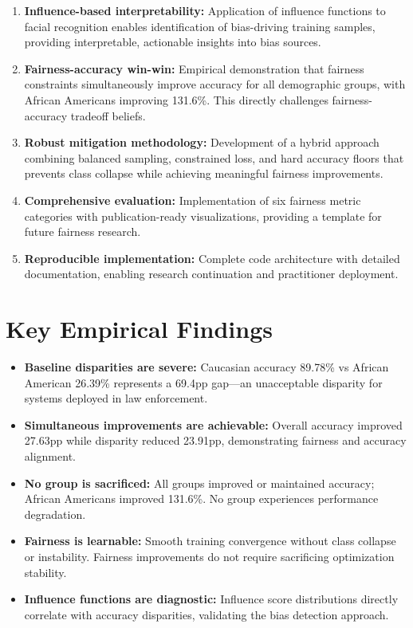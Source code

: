 \documentclass[11pt,a4paper,oneside]{report}
\begin{document}
\begin{enumerate}

\item \textbf{Influence-based interpretability:} Application of influence functions to facial recognition enables identification of bias-driving training samples, providing interpretable, actionable insights into bias sources.

\item \textbf{Fairness-accuracy win-win:} Empirical demonstration that fairness constraints simultaneously improve accuracy for all demographic groups, with African Americans improving 131.6\%. This directly challenges fairness-accuracy tradeoff beliefs.

\item \textbf{Robust mitigation methodology:} Development of a hybrid approach combining balanced sampling, constrained loss, and hard accuracy floors that prevents class collapse while achieving meaningful fairness improvements.

\item \textbf{Comprehensive evaluation:} Implementation of six fairness metric categories with publication-ready visualizations, providing a template for future fairness research.

\item \textbf{Reproducible implementation:} Complete code architecture with detailed documentation, enabling research continuation and practitioner deployment.

\end{enumerate}

\section{Key Empirical Findings}

\begin{itemize}

\item \textbf{Baseline disparities are severe:} Caucasian accuracy 89.78\% vs African American 26.39\% represents a 69.4pp gap---an unacceptable disparity for systems deployed in law enforcement.

\item \textbf{Simultaneous improvements are achievable:} Overall accuracy improved 27.63pp while disparity reduced 23.91pp, demonstrating fairness and accuracy alignment.

\item \textbf{No group is sacrificed:} All groups improved or maintained accuracy; African Americans improved 131.6\%. No group experiences performance degradation.

\item \textbf{Fairness is learnable:} Smooth training convergence without class collapse or instability. Fairness improvements do not require sacrificing optimization stability.

\item \textbf{Influence functions are diagnostic:} Influence score distributions directly correlate with accuracy disparities, validating the bias detection approach.

\end{itemize}
\end{document}
